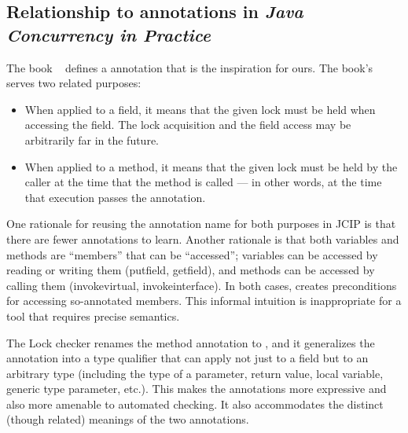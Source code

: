 \subsection{Relationship to annotations in \emph{Java Concurrency in Practice}\label{jcip-annotations}}

The book ~\cite{Goetz2006} defines a
 annotation that is the inspiration for ours.  The book's
 serves two related purposes:

\begin{itemize}
\item
  When applied to a field, it means that the given lock must be held when
  accessing the field.  The lock acquisition and the field access may be
  arbitrarily far in the future.
\item
  When applied to a method, it means that the given lock must be held by
  the caller at the time that the method is called --- in other words, at
  the time that execution passes the  annotation.
\end{itemize}

One rationale for reusing the annotation name for both purposes in JCIP is
that there are fewer annotations to learn.  Another rationale is
that both variables and methods are ``members'' that can be ``accessed'';
variables can be accessed by reading or writing them (putfield, getfield),
and methods can be accessed by calling them (invokevirtual,
invokeinterface).  In both cases,  creates preconditions
for accessing so-annotated members.  This informal intuition is
inappropriate for a tool that requires precise semantics.

The Lock checker renames the method annotation to
, and it generalizes the 
 annotation into a type qualifier
that can apply not just to a field but to an arbitrary type (including the
type of a parameter, return value, local variable, generic type parameter,
etc.).  This makes the annotations more expressive and also more amenable
to automated checking.  It also accommodates the distinct (though related)
meanings of the two annotations.




